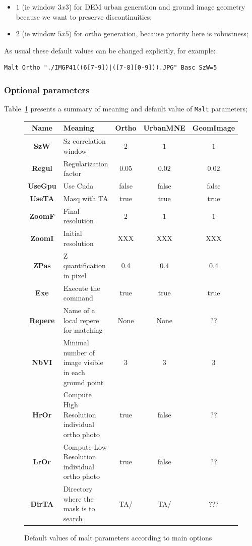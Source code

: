 \begin{itemize}
   \item $1$ (ie window $3x3$) for DEM urban generation and ground image geometry
	  because we want to preserve discontinuities;
   \item $2$ (ie window $5x5$) for ortho generation, because priority here is robustness;
\end{itemize}

As usual these default values can be changed explicitly, for example:


\begin{verbatim}
Malt Ortho "./IMGP41((6[7-9])|([7-8][0-9])).JPG" Basc SzW=5
\end{verbatim}



\subsubsection{Optional parameters}

Table~\ref{Tab:ArgMalt} presents a summary of meaning and default value of
{\tt Malt} parameters;

\begin{figure}
\begin{tabular} { c | p{5 cm} | c | c | c}
{\bf Name }  &   {\bf Meaning } & {\bf Ortho } &  {\bf UrbanMNE} &{\bf GeomImage } \\  \hline \hline
{\bf SzW }  &   Sz correlation window & $2$ &  $ 1 $  &$1$ \\  \hline
{\bf Regul }  &  Regularization factor & $0.05$ &  $0.02$  & $0.02$ \\  \hline
{\bf UseGpu }  &  Use Cuda & false &  false  & false \\  \hline
{\bf UseTA }  &  Masq with TA & true &  true  & true \\  \hline
{\bf ZoomF }  &  Final resolution &  $2$ &  $1$   & $1$ \\  \hline
{\bf ZoomI }  &  Initial resolution &  XXX &  XXX   & XXX\\  \hline
{\bf ZPas }  &   Z quantification in pixel &  0.4 &  0.4  & 0.4 \\  \hline
{\bf Exe }  &   Execute the command &  true &  true   & true \\  \hline
{\bf Repere }  &   Name of a local repere for matching &  None &  None  & ?? \\  \hline
{\bf NbVI }  &   Minimal number of image visible in each ground point &  $3$ &  $3$ & $3$  \\  \hline
{\bf HrOr }  &   Compute High Resolution individual ortho photo &  true &  false  & ?? \\  \hline
{\bf LrOr }  &   Compute Low Resolution individual ortho photo &  true &  false  & ??\\  \hline
{\bf DirTA}  &   Directory where the mask is to search &  TA/ &  TA/   & ??? \\  \hline
\end{tabular}
\caption{Default values of malt parameters according to main options}
\label{Tab:ArgMalt}
\end{figure}

